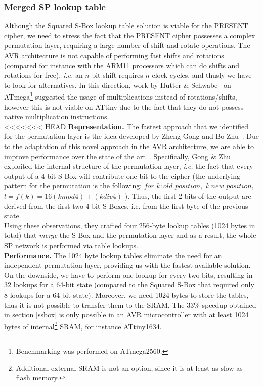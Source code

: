 \documentclass[11pt]{article}
\begin{document}
\subsubsection{Merged SP lookup table}\label{msbox}
Although the Squared S-Box lookup table solution is viable for the PRESENT cipher, we need to stress the fact that the PRESENT cipher possesses a complex permutation layer, requiring a large number of shift and rotate operations. The AVR architecture is not capable of performing fast shifts and rotations (compared for instance with the ARM11 processors which can do shifts and rotations for free),  \emph{i.e.} an $n$-bit shift requires $n$ clock cycles, and thusly we have to look for alternatives.
In this direction, work by Hutter \& Schwabe~\cite{hutternacl} on ATmega\footnote{Benchmarking was performed on ATmega2560.} suggested the usage of multiplications instead of rotations/shifts, however this is not viable on ATtiny due to the fact that they do not possess native multiplication instructions.\\
<<<<<<< HEAD
\textbf{Representation.} The fastest approach that we identified for the permutation layer is the idea developed by Zheng Gong and Bo Zhu~\cite{gong_code,gong2009towards}. Due to the adaptation of this novel approach in the AVR architecture, we are able to improve performance over the state of the art~\cite{eisenbarth2012compact}. Specifically, Gong \& Zhu exploited the internal structure of the permutation layer, \emph{i.e.} the fact that every output of a 4-bit S-Box will contribute one bit to the cipher (the underlying pattern for the permutation is the following: $for$ $k:old$ $position,$ $l:new$ $position,$ $l=f(k)=16(k mod 4)+(k div 4)$ ). Thus, the first 2 bits of the output are derived from the first two 4-bit S-Boxes, i.e. from the first byte of the previous state. \\
Using these observations, they crafted four 256-byte lookup tables (1024 bytes in total) that \emph{merge} the S-Box and the permutation layer and as a result, the whole SP network is performed via table lookups.\\
\textbf{Performance.} The 1024 byte lookup tables eliminate the need for an independent permutation layer, providing us with the fastest available solution. On the downside, we have to perform one lookup for every two bits, resulting in 32 lookups for a 64-bit state (compared to the Squared S-Box that required only 8 lookups for a 64-bit state). Moreover, we need 1024 bytes to store the tables, thus it is not possible to transfer them to the SRAM. The 33\% speedup obtained in section \ref{ssbox} is only possible in an AVR microcontroller with at least 1024 bytes of internal\footnote{Additional external SRAM is not an option, since it is at least as slow as flash memory.} SRAM, for instance ATtiny1634.\\
\end{document}
